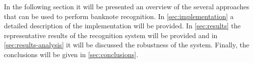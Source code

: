 In the following section it will be presented an overview of the several approaches that can be used to perform banknote recognition. In \cref{sec:implementation} a detailed description of the implementation will be provided. In \cref{sec:results} the representative results of the recognition system will be provided and in \cref{sec:results-analysis} it will be discussed the robustness of the system. Finally, the conclusions will be given in \cref{sec:conclusions}.
